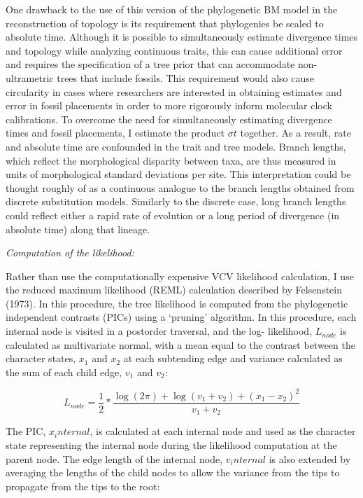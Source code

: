 \documentclass[12pt]{article}
\begin{document}
One drawback to the use of this version of the phylogenetic BM model in
the reconstruction of topology is its requirement that phylogenies be
scaled to absolute time. Although it is possible to simultaneously
estimate divergence times and topology while analyzing continuous
traits, this can cause additional error and requires the specification
of a tree prior that can accommodate non-ultrametric trees that include
fossils. This requirement would also cause circularity in cases where
researchers are interested in obtaining estimates and error in fossil
placements in order to more rigorously inform molecular clock
calibrations. To overcome the need for simultaneously estimating
divergence times and fossil placements, I estimate the product
$\sigma t$ together. As a result, rate and absolute time are
confounded in the trait and tree models. Branch lengths, which reflect the morphological disparity
between taxa, are thus measured in units of morphological standard
deviations per site. This interpretation could be thought roughly of as
a continuous analogue to the branch lengths obtained from discrete
substitution models. Similarly to the discrete case, long branch lengths
could reflect either a rapid rate of evolution or a long period of
divergence (in absolute time) along that lineage.

\noindent\emph{Computation of the likelihood:}

Rather than use the computationally expensive VCV likelihood
calculation, I use the reduced maximum likelihood (REML) calculation
described by Felsenstein (1973). In this procedure,  the tree likelihood is computed  from the
phylogenetic independent contrasts (PICs) using a `pruning' algorithm. In this procedure, each internal node is visited in a postorder traversal, and the log- likelihood, $L_{node}$ is calculated  as multivariate normal, with a mean equal to the contrast between the character states, $x_1$ and $x_2$ at each subtending edge  and variance  calculated as the sum of each child edge, $v_1$ and $v_2$:

\begin{equation}
L_{node} = \frac{1}{2}*\frac{\log{(2\pi)}+\log{(v_1+v_2)}+(x_1-x_2)^2}{v_1+v_2}
\end{equation}

\noindent  The PIC, $x_internal$, is  calculated at each internal node and used as the character state representing the internal node during the likelihood computation at the parent node. The edge length of the internal node, $v_internal$ is also extended by averaging the lengths of the child nodes to allow the variance from the tips to propagate from the tips to the root:
\end{document}
